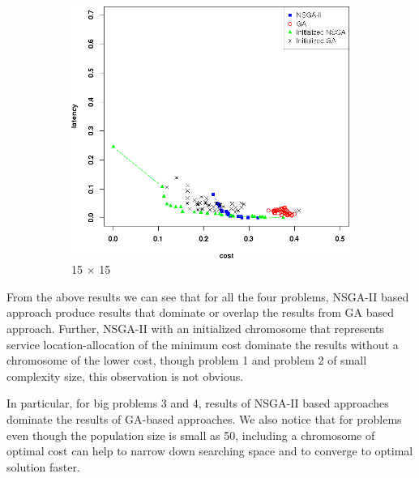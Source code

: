 \documentclass{llncs}
\begin{document}
\begin{figure}[H]
\begin{subfigure}[b]{0.45\textwidth}
	\end{subfigure}
	\begin{subfigure}[b]{0.45\textwidth}
		\includegraphics[width=\textwidth]{pics/pop_50_gen_50_15_times_15_sufficient_initialisation.png}
		\caption{15 $\times$ 15}
	\end{subfigure}
	\caption{}\label{fig:c1}
\end{figure}

From the above results we can see that for all the four problems, NSGA-II based approach produce results that dominate or overlap the results from GA based approach. Further,
NSGA-II with an initialized chromosome that represents service location-allocation of the minimum cost dominate the results without a chromosome of the lower cost, though problem 1 and
problem 2 of small complexity size, this observation is not obvious.

In particular, for big problems 3 and 4, results of NSGA-II based approaches dominate the results of GA-based approaches. We also notice that for problems even though the population size
is small as 50, including a chromosome of optimal cost can help to narrow down searching space and to converge to optimal solution faster.

\end{document}
